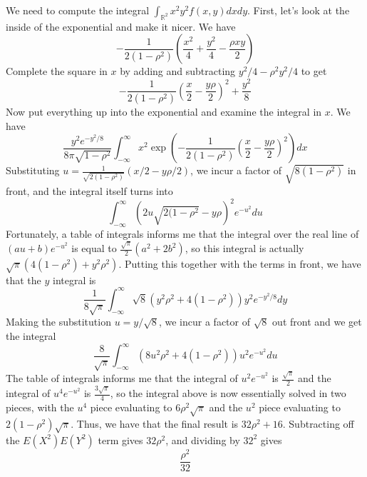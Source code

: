 \documentclass{article}
\newcommand{\rn}{\mathbb{R}}
\begin{document}
We need to compute the integral $\int_{\rn^2}x^2y^2f(x,y) dx dy$. First, let's look at the inside of the exponential and make it nicer. We have 
$$-\frac{1}{2(1-\rho^2)}\left(\frac{x^2}{4}+\frac{y^2}{4}-\frac{\rho xy}{2}\right)$$
Complete the square in $x$ by adding and subtracting $y^2/4-\rho^2y^2/4$ to get 
$$-\frac{1}{2(1-\rho^2)}\left(\frac{x}{2}-\frac{y\rho}{2}\right)^2+\frac{y^2}{8}$$
Now put everything up into the exponential and examine the integral in $x$. We have
$$\frac{y^2e^{-y^2/8}}{8\pi\sqrt{1-\rho^2}}\int_{-\infty}^{\infty}x^2\exp\left(-\frac{1}{2(1-\rho^2)}\left(\frac{x}{2}-\frac{y\rho}{2}\right)^2\right)dx$$
Substituting $u=\frac{1}{\sqrt{2(1-\rho^2)}}(x/2-y\rho/2)$, we incur a factor of $\sqrt{8(1-\rho^2)}$ in front, and the integral itself turns into 
$$\int_{-\infty}^{\infty}(2u\sqrt{2(1-\rho^2}-y\rho)^2e^{-u^2}du$$
Fortunately, a table of integrals informs me that the integral over the real line of $(au+b)e^{-u^2}$ is equal to $\frac{\sqrt{\pi}}{2}(a^2+2b^2)$, so this integral is actually $\sqrt{\pi}(4(1-\rho^2)+y^2\rho^2)$. Putting this together with the terms in front, we have that the $y$ integral is 
$$\frac{1}{8\sqrt{\pi}}\int_{-\infty}^\infty\sqrt{8}(y^2\rho^2+4(1-\rho^2))y^2e^{-y^2/8} dy$$
Making the substitution $u=y/\sqrt{8}$, we incur a factor of $\sqrt{8}$ out front and we get the integral 
$$\frac{8}{\sqrt{\pi}}\int_{-\infty}^\infty(8u^2\rho^2+4(1-\rho^2))u^2e^{-u^2}du$$
The table of integrals informs me that the integral of $u^2e^{-u^2}$ is $\frac{\sqrt{\pi}}{2}$ and the integral of $u^4e^{-u^2}$ is $\frac{3\sqrt{\pi}}{4}$, so the integral above is now essentially solved in two pieces, with the $u^4$ piece evaluating to $6\rho^2\sqrt{\pi}$ and the $u^2$ piece evaluating to $2(1-\rho^2)\sqrt{\pi}$. Thus, we have that the final result is $32\rho^2+16$. Subtracting off the $E(X^2)E(Y^2)$ term gives $32\rho^2$, and dividing by $32^2$ gives 
$$\frac{\rho^2}{32}$$
\end{document}
